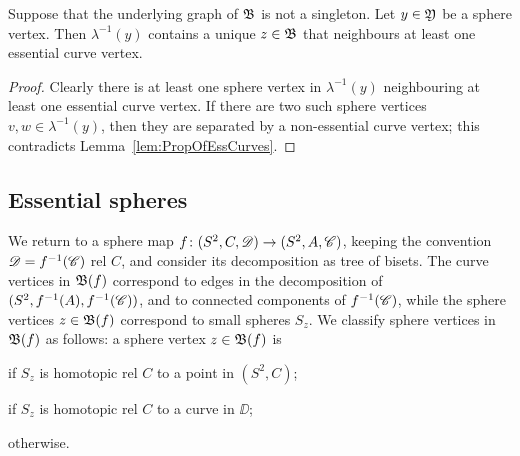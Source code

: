 \documentclass{amsart}
\begin{document}
\begin{cor}\label{cor:EssSphVert}
  Suppose that the underlying graph of ${\mathfrak B}$ is not a
  singleton. Let $y\in {\mathfrak Y}$ be a sphere vertex. Then
  $\lambda^{-1}(y)$ contains a unique $z\in {\mathfrak B}$ that
  neighbours at least one essential curve vertex.
\end{cor}
\begin{proof}
  Clearly there is at least one sphere vertex in $\lambda^{-1}(y)$
  neighbouring at least one essential curve vertex. If there are two
  such sphere vertices $v,w\in \lambda^{-1}(y)$, then they are
  separated by a non-essential curve vertex; this contradicts
  Lemma~\ref{lem:PropOfEssCurves}.
\end{proof}

\subsection{Essential spheres}
We return to a sphere map $f\colon(S^2,C,{\mathscr D})\to(S^2,A,{\mathscr C})$, keeping
the convention ${\mathscr D}=f^{-1}({\mathscr C})$ rel $C$, and consider its
decomposition as tree of bisets. The curve vertices in
${\mathfrak B}(f)$ correspond to edges in the decomposition of
$(S^2,f^{-1}(A),f^{-1}({\mathscr C}))$, and to connected components of
$f^{-1}({\mathscr C})$, while the sphere vertices $z\in{\mathfrak B}(f)$
correspond to small spheres $S_z$. We classify sphere vertices in
${\mathfrak B}(f)$ as follows: a sphere vertex $z\in{\mathfrak B}(f)$ is
\begin{idescription}
\item[trivial] if $S_z$ is homotopic rel $C$ to a point in $(S^2,C)$;
\item[annular] if $S_z$ is homotopic rel $C$ to a curve in $\DD$;
\item[essential] otherwise.
\end{idescription}
\end{document}
